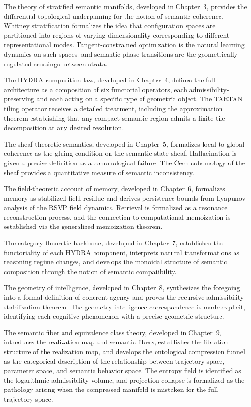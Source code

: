 \documentclass[12pt, a4paper, openany]{book}
\theoremstyle{plain}
\theoremstyle{definition}
\theoremstyle{remark}
\begin{document}
The theory of stratified semantic manifolds, developed in Chapter~3, provides the differential-topological underpinning for the notion of semantic coherence. Whitney stratification formalizes the idea that configuration spaces are partitioned into regions of varying dimensionality corresponding to different representational modes. Tangent-constrained optimization is the natural learning dynamics on such spaces, and semantic phase transitions are the geometrically regulated crossings between strata.

The HYDRA composition law, developed in Chapter~4, defines the full architecture as a composition of six functorial operators, each admissibility-preserving and each acting on a specific type of geometric object. The TARTAN tiling operator receives a detailed treatment, including the approximation theorem establishing that any compact semantic region admits a finite tile decomposition at any desired resolution.

The sheaf-theoretic semantics, developed in Chapter~5, formalizes local-to-global coherence as the gluing condition on the semantic state sheaf. Hallucination is given a precise definition as a cohomological failure. The Čech cohomology of the sheaf provides a quantitative measure of semantic inconsistency.

The field-theoretic account of memory, developed in Chapter~6, formalizes memory as stabilized field residue and derives persistence bounds from Lyapunov analysis of the RSVP field dynamics. Retrieval is formalized as a resonance reconstruction process, and the connection to computational memoization is established via the generalized memoization theorem.

The category-theoretic backbone, developed in Chapter~7, establishes the functoriality of each HYDRA component, interprets natural transformations as reasoning regime changes, and develops the monoidal structure of semantic composition through the notion of semantic compatibility.

The geometry of intelligence, developed in Chapter~8, synthesizes the foregoing into a formal definition of coherent agency and proves the recursive admissibility stabilization theorem. The geometry-intelligence correspondence is made explicit, identifying each cognitive phenomenon with a precise geometric structure.

The semantic fiber and equivalence class theory, developed in Chapter~9, introduces the realization map and semantic fibers, establishes the fibration structure of the realization map, and develops the ontological compression funnel as the categorical description of the relationship between trajectory space, parameter space, and semantic behavior space. The entropy field is identified as the logarithmic admissibility volume, and projection collapse is formalized as the pathology arising when the compressed manifold is mistaken for the full trajectory space.
\end{document}
